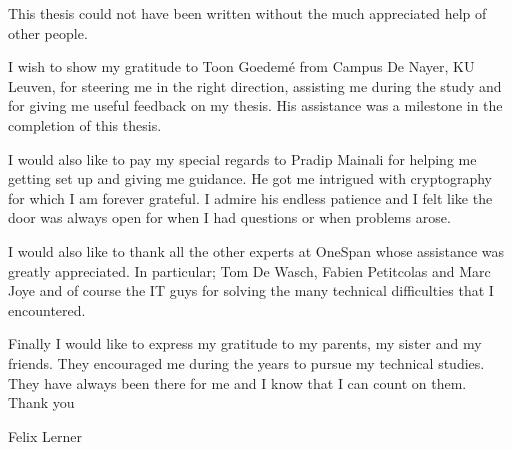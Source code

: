 This thesis could not have been written without the much appreciated help of other people.

I wish to show my gratitude to Toon Goedem{\'e} from Campus De Nayer, KU Leuven, for steering me in the right direction, assisting me during the study and for giving me useful feedback on my thesis. His assistance was a milestone in the completion of this thesis.

I would also like to pay my special regards to Pradip Mainali for helping me getting set up and giving me guidance. He got me intrigued with cryptography for which I am forever grateful. I admire his endless patience and I felt like the door was always open for when I had questions or when problems arose.

 I would also like to thank all the other experts at OneSpan whose assistance was greatly appreciated. In particular; Tom De Wasch, Fabien Petitcolas and Marc Joye and of course the IT guys for solving the many technical difficulties that I encountered.

Finally I would like to express my gratitude to my parents, my sister and my friends. They encouraged me during the years to pursue my technical studies. They have always been there for me and I know that I can count on them.\\

Thank you

Felix Lerner
